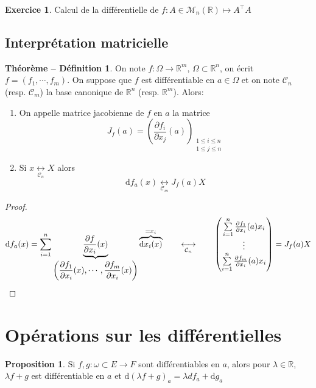 \documentclass{article}
\theoremstyle{definition}
\newtheorem*{thmdef}{Théorème -- Définition}
\newtheorem*{prop}{Proposition}
\newtheorem*{exo}{Exercice}
\begin{document}
\begin{exo} Calcul de la différentielle de
{$f:A\in\mathcal M_n(\mathbb R)\longmapsto A^\intercal A$}
\end{exo}

\subsection{Interprétation matricielle}

\begin{thmdef}
On note $f:\Omega\to \mathbb R^m$, $\Omega\subset \mathbb R^n$, on écrit $f=(f_1, \cdots, f_m)$. On suppose que $f$ est différentiable en $a\in\Omega$ et on note $\mathcal C_n$ (resp. $\mathcal C_m$) la base canonique de $\mathbb R^n$ (resp. $\mathbb R^m$). Alors: \begin{enumerate}
    \item On appelle matrice jacobienne de $f$ en $a$ la matrice \[
        J_f(a)=\left(\frac{\partial f_i}{\partial x_j}(a)\right)_{\substack{1\leq i\leq n\\ 1\leq j\leq n}}
    \]
    \item Si $x\underset{\mathcal C_n}{\longleftrightarrow}X$ alors \[
        \mathrm df_a(x)\underset{\mathcal C_m}\longleftrightarrow J_f(a)X
    \]
\end{enumerate}
\end{thmdef}

\begin{proof}
\[
    \mathrm df_a(x)=\sum_{i=1}^n\underbrace{\frac{\partial f}{\partial x_i}(x)}_{\displaystyle \left(\frac{\partial f_1}{\partial x_i}(x), \cdots, \frac{\partial f_m}{\partial x_i}(x)\right)}\overbrace{\mathrm dx_i(x)}^{=x_i} \qquad \underset{\mathcal C_n}{\longleftrightarrow}\qquad \begin{pmatrix}
    \sum_{i=1}^n\limits \frac{\partial f_1}{\partial x_i}(a)x_i \\
    \vdots \\
    \sum_{i=1}^n\limits \frac{\partial f_m}{\partial x_i}(a)x_i 
    \end{pmatrix}=J_f(a)X
\]
\end{proof}

\section{Opérations sur les différentielles}

\begin{prop}
Si $f,g:\omega\subset E\to F$ sont différentiables en $a$, alors pour $\lambda\in\mathbb R$, $\lambda f+g$ est différentiable en $a$ et $\mathrm d(\lambda f+g)_a=\lambda df_a+\mathrm dg_a$
\end{prop}
\end{document}
